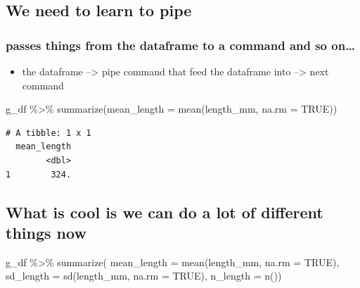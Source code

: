 \documentclass[
]{article}
\newenvironment{Shaded}{}{}
\newcommand{\AttributeTok}[1]{\textcolor[rgb]{0.84,0.23,0.29}{#1}}
\newcommand{\ConstantTok}[1]{\textcolor[rgb]{0.00,0.36,0.77}{#1}}
\newcommand{\FunctionTok}[1]{\textcolor[rgb]{0.44,0.26,0.76}{#1}}
\newcommand{\NormalTok}[1]{\textcolor[rgb]{0.14,0.16,0.18}{#1}}
\newcommand{\SpecialCharTok}[1]{\textcolor[rgb]{0.00,0.36,0.77}{#1}}
\providecommand{\tightlist}{%
  \setlength{\itemsep}{0pt}\setlength{\parskip}{0pt}}\usepackage{longtable,booktabs,array}
\begin{document}
\subsection{We need to learn to pipe}\label{we-need-to-learn-to-pipe}

\subsubsection{passes things from the dataframe to a command and so
on\ldots{}}\label{passes-things-from-the-dataframe-to-a-command-and-so-on}

\begin{itemize}
\tightlist
\item
  the dataframe --\textgreater{} pipe command that feed the dataframe
  into --\textgreater{} next command
\end{itemize}

\begin{Shaded}
\begin{Highlighting}[]
\NormalTok{g\_df }\SpecialCharTok{\%\textgreater{}\%} \FunctionTok{summarize}\NormalTok{(}\AttributeTok{mean\_length =} \FunctionTok{mean}\NormalTok{(length\_mm, }\AttributeTok{na.rm =} \ConstantTok{TRUE}\NormalTok{))}
\end{Highlighting}
\end{Shaded}

\begin{verbatim}
# A tibble: 1 x 1
  mean_length
        <dbl>
1        324.
\end{verbatim}

\subsection{What is cool is we can do a lot of different things
now}\label{what-is-cool-is-we-can-do-a-lot-of-different-things-now}

\begin{Shaded}
\begin{Highlighting}[]
\NormalTok{g\_df }\SpecialCharTok{\%\textgreater{}\%} 
  \FunctionTok{summarize}\NormalTok{(}
    \AttributeTok{mean\_length =} \FunctionTok{mean}\NormalTok{(length\_mm, }\AttributeTok{na.rm =} \ConstantTok{TRUE}\NormalTok{),}
    \AttributeTok{sd\_length =} \FunctionTok{sd}\NormalTok{(length\_mm, }\AttributeTok{na.rm =} \ConstantTok{TRUE}\NormalTok{),}
    \AttributeTok{n\_length =} \FunctionTok{n}\NormalTok{())}
\end{Highlighting}
\end{Shaded}
\end{document}
